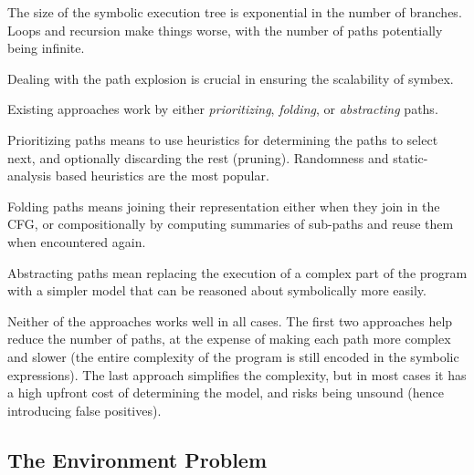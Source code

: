 
The size of the symbolic execution tree is exponential in the number of branches. Loops and recursion make things worse, with the number of paths potentially being infinite.

Dealing with the path explosion is crucial in ensuring the scalability of symbex.

Existing approaches work by either \emph{prioritizing}, \emph{folding}, or \emph{abstracting} paths.

Prioritizing paths means to use heuristics for determining the paths to select next, and optionally discarding the rest (pruning).  Randomness and static-analysis based heuristics are the most popular.

Folding paths means joining their representation either when they join in the CFG, or compositionally by computing summaries of sub-paths and reuse them when encountered again.

Abstracting paths mean replacing the execution of a complex part of the program with a simpler model that can be reasoned about symbolically more easily.

Neither of the approaches works well in all cases. The first two approaches help reduce the number of paths, at the expense of making each path more complex and slower (the entire complexity of the program is still encoded in the symbolic expressions).  The last approach simplifies the complexity, but in most cases it has a high upfront cost of determining the model, and risks being unsound (hence introducing false positives).

\subsection{The Environment Problem}

